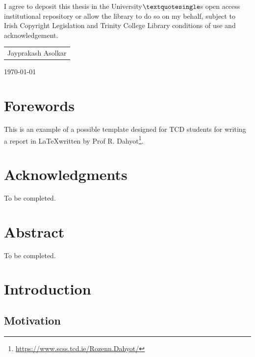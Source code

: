 \documentclass[english,a4paper,11pt,oneside,onecolumn]{book}
\begin{document}
\noindent I agree to deposit this thesis in the University$\textquotesingle$s open access institutional repository or
allow the library to do so on my behalf, subject to Irish Copyright Legislation and
Trinity College Library conditions of use and acknowledgement.


\vspace{3cm}
\begin{flushright}

\begin{tabular}{l}
\hline
Jayprakash Asolkar\\
\end{tabular}

\vspace{0.5cm}

\today
\end{flushright}



\chapter*{Forewords}

This is an example  of a possible  template designed for TCD students for writing a report in \LaTeX written by  Prof R. Dahyot\footnote{\url{https://www.scss.tcd.ie/Rozenn.Dahyot/}}. 

\chapter*{Acknowledgments}

To be completed.

\chapter*{Abstract}
To be completed.

\tableofcontents

\listoffigures

\listoftables


%

\chapter{Introduction} 

\section{Motivation}
\end{document}
